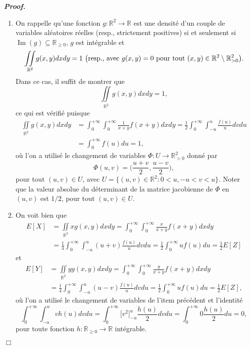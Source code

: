 \documentclass[11pt,a4paper]{article}
\newcommand{\RR}{\mathbb{R}}
\newenvironment{preuve}[1][]
{\vskip 2mm  \noindent\emph{\bf Proof#1. }}{$\Box$ \vskip 2mm}
\let\geq\geqslant
\begin{document}
		\begin{preuve}
			\begin{enumerate}
				\item On rappelle qu'une fonction $g : \RR^{2} \rightarrow \RR$ est une densité d'un couple de variables aléatoires réelles (resp., strictement positives) si et seulement si $\operatorname{Im}(g) \subseteq \RR_{\geq 0}$, $g$ est intégrable et 
				\[     \underset{\RR^{2}}{\iint} g(x,y) dx dy = 1 \text{ \big(resp., avec $g(x,y) = 0$ pour tout $(x,y) \in \RR^{2} \setminus \RR^{2}_{>0}$\big)}.     \]
				Dans ce cas, il suffit de montrer que 
				\[     \underset{\RR^{2}}{\iint} g(x,y) dx dy = 1,     \]
				ce qui est vérifié puisque 
				\begin{align*}
				\underset{\RR^{2}}{\iint} g(x,y) dx dy &= \int_{0}^{+ \infty} \int_{0}^{+ \infty} \frac{1}{x+y}f(x+y) dx dy = \frac{1}{2} \int_{0}^{+ \infty} \int_{-u}^{u} \frac{f(u)}{u} dv du 
				\\
				&= \int_{0}^{+ \infty} f(u) du = 1,     
				\end{align*}
				où l'on a utilisé le changement de variables $\Phi : U \rightarrow \RR^{2}_{>0}$ donné par 
				\[     \Phi(u,v) = \bigg(\frac{u+v}{2},\frac{u-v}{2}\bigg),     \]
				pour tout $(u,v) \in U$, avec $U = \{ (u,v) \in \RR^{2} : 0 < u, -u < v < u \}$. 
				Noter que la valeur absolue du déterminant de la matrice jacobienne de $\Phi$ en $(u,v)$ est $1/2$, pour tout $(u,v) \in U$. 
				
				\item On voit bien que 
				\begin{align*}
				E[X] &= \underset{\RR^{2}}{\iint} x g(x,y) dx dy = \int_{0}^{+ \infty} \int_{0}^{+ \infty} \frac{x}{x+y}f(x+y) dx dy 
				\\
				&= \frac{1}{4} \int_{0}^{+ \infty} \int_{-u}^{u} (u+v) \frac{f(u)}{u} dv du = \frac{1}{2} \int_{0}^{+ \infty} u f(u) du  = \frac{1}{2} E[Z]     
				\end{align*}
				et 
				\begin{align*}
				E[Y] &= \underset{\RR^{2}}{\iint} y g(x,y) dx dy = \int_{0}^{+ \infty} \int_{0}^{+ \infty} \frac{y}{x+y}f(x+y) dx dy 
				\\
				&= \frac{1}{4} \int_{0}^{+ \infty} \int_{-u}^{u} (u-v) \frac{f(u)}{u} dv du = \frac{1}{2} \int_{0}^{+ \infty} u f(u) du  = \frac{1}{2} E[Z],     
				\end{align*}
				où l'on a utilisé le changement de variables de l'item précédent et l'identité 
				\begin{equation}
				\label{eq:use} 
				\int_{0}^{+ \infty} \int_{-u}^{u} v h(u) dv du = \int_{0}^{+ \infty} \bigg[ v^{2} \bigg]_{-u}^{u} \frac{h(u)}{2} dv du = \int_{0}^{+ \infty} 0 \frac{h(u)}{2} du =  0,    
				\end{equation}
				pour toute fonction $h : \RR_{\geq 0} \rightarrow \RR$ intégrable. 
				

\end{enumerate}
\end{preuve}
\end{document}
